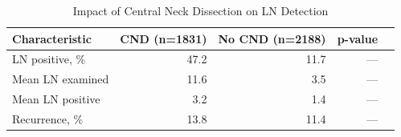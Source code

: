 \documentclass{article}
\begin{document}
\vspace{1em}
\begin{table}[h]
\caption{Impact of Central Neck Dissection on LN Detection}
\centering
\begin{tabular}{lrrrr}
\toprule
Characteristic & CND (n=1831) & No CND (n=2188) & p-value \\
\midrule
LN positive, \% & 47.2 & 11.7 & — \\
Mean LN examined & 11.6 & 3.5 & — \\
Mean LN positive & 3.2 & 1.4 & — \\
Recurrence, \% & 13.8 & 11.4 & — \\
\bottomrule
\end{tabular}
\end{table}
\end{document}
